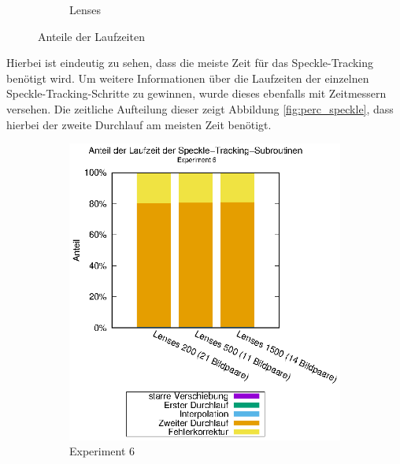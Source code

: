 \begin{center}
\begin{figure}[htbp]
\begin{subfigure}[b]{0.5\textwidth}
			\caption{Lenses}
			\label{fig:perc_main_lenses}
		\end{subfigure}
		\caption{Anteile der Laufzeiten}
		\label{fig:perc_main}
	\end{figure}
\end{center}

Hierbei ist eindeutig zu sehen, dass die meiste Zeit für das Speckle-Tracking benötigt wird. Um weitere Informationen über die Laufzeiten der einzelnen Speckle-Tracking-Schritte zu gewinnen, wurde dieses ebenfalls mit Zeitmessern versehen. Die zeitliche Aufteilung dieser zeigt Abbildung \ref{fig:perc_speckle}, dass hierbei der zweite Durchlauf am meisten Zeit benötigt. 

\begin{center}
	\begin{figure}[htbp]
		\begin{subfigure}[b]{0.5\textwidth}
			\centering
			\includegraphics[width=\textwidth]{pdf/speckle_exp6}
			\caption{Experiment 6}
			\label{fig:perc_speckle_exp6}
		\end{subfigure}
		\begin{subfigure}[b]{0.5\textwidth}
			\centering

\end{subfigure}
\end{figure}
\end{center}
